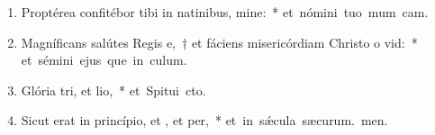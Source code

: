 \begin{flushleft}
\begin{enumerate}[leftmargin=*]
\item Proptérea confitébor tibi in natinibus, mine:~* \mbox{et nómini tuo mum cam.}
\item Magníficans salútes Regis e,~† et fáciens misericórdiam Christo o vid:~* \mbox{et sémini ejus que in culum.}
\item Glória tri, et lio,~* \mbox{et Spitui cto.}
\item Sicut erat in princípio, et , et per,~* \mbox{et in s\'{\ae}cula sæcurum. men.}

\end{enumerate}
\end{flushleft}

